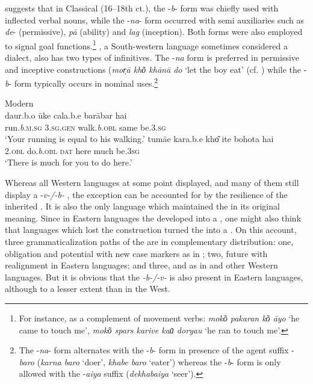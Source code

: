 \documentclass[output=paper]{langsci/langscibook}
\begin{document}
\citet[16]{Snell1991} suggests that in Classical  (16--18th ct.), the -\textit{b}{}- form was chiefly used with inflected verbal nouns, while the -\textit{na}{}- form occurred with semi auxiliaries such as \textit{de}{}- (permissive), \textit{pā} (ability) and \textit{lag} (inception). Both forms were also employed to signal goal functions.\footnote{For instance, as a complement of movement verbs: \textit{moko͂ pakaran ko͂ āyo} ‘he came to touch me’, \textit{moko͂ spars karive kau͂ doryau} ‘he ran to touch me’.}
, a South-western language sometimes considered a  dialect, also has two types of infinitives. The -\textit{na} form is preferred in permissive and inceptive constructions (\textit{mor̩ā kho͂ khānā do} ‘let the boy eat’ (cf. \citealt[132]{Jaiswal1962}) while the -\textit{b}{}- form typically occurs in nominal uses.\footnote{ The -\textit{na}{}- form alternates with the -\textit{b}- form in presence of the agent suffix -\textit{baro} (\textit{karna baro} ‘doer’, \textit{khabe baro} ‘eater’) whereas the -\textit{b}{}- form is only allowed with the -\textit{aiya} suffix (\textit{dekhabaiya} ‘seer’).}

\ea\label{ex:montaut:41}
\ea 
Modern \\
\gll daur.b.o  ūke  cala.b.e       barābar hai\\
run.\textit{b}.\textsc{m.sg}     \textsc{3.sg.gen}    walk.\textit{b.}\textsc{obl}   same        be.\textsc{3.sg} \\
\glt ‘Your running is equal to his walking.’ \citep[133]{Jaiswal1962}
\ex 
\gll tumāe   kara.b.e  kho͂  ite bohota   hai\\
\textsc{2.obl} do.\textit{b}.\textsc{obl}   \textsc{dat} here much be.\textsc{3sg} \\
\glt ‘There is much for you to do here.’ \citep[133]{Jaiswal1962}
\z 
\z 

Whereas all Western languages at some point displayed, and many of them still display a -\textit{v-/-b-} , the  exception can be accounted for by the resilience of the inherited  . It is also the only language which maintained the   in its original  meaning. Since in Eastern languages the  developed into a , one might also think that languages which lost the  construction turned the  into a . On this account, three grammaticalization paths of the  are in complementary distribution: one, obligation and potential with new case markers as in ; two, future with realignment in Eastern languages; and three,  and  as in  and other Western languages. But it is obvious that the \textit{-b-/-v-}  is also present in Eastern languages, although to a lesser extent than in the West.
\end{document}
